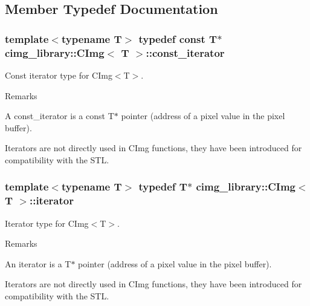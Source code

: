 \subsection{Member Typedef Documentation}
\hypertarget{structcimg__library_1_1_c_img_ad444f21017aaa7da6fab45930d3579aa}{
\subsubsection[{const\_\-iterator}]{\setlength{\rightskip}{0pt plus 5cm}template$<$typename T$>$ typedef const T$\ast$ {\bf cimg\_\-library::CImg}$<$ T $>$::{\bf const\_\-iterator}}}
\label{structcimg__library_1_1_c_img_ad444f21017aaa7da6fab45930d3579aa}


Const iterator type for CImg$<$T$>$. 

\begin{DoxyRemark}{Remarks}

\begin{DoxyItemize}
\item A {\ttfamily const\_\-iterator} is a {\ttfamily const T$\ast$} pointer (address of a pixel value in the pixel buffer).
\item Iterators are not directly used in CImg functions, they have been introduced for compatibility with the STL. 
\end{DoxyItemize}
\end{DoxyRemark}
\hypertarget{structcimg__library_1_1_c_img_a3ff3f07802e67c4ba930427ea45655c8}{
\subsubsection[{iterator}]{\setlength{\rightskip}{0pt plus 5cm}template$<$typename T$>$ typedef T$\ast$ {\bf cimg\_\-library::CImg}$<$ T $>$::{\bf iterator}}}
\label{structcimg__library_1_1_c_img_a3ff3f07802e67c4ba930427ea45655c8}


Iterator type for CImg$<$T$>$. 

\begin{DoxyRemark}{Remarks}

\begin{DoxyItemize}
\item An {\ttfamily iterator} is a {\ttfamily T$\ast$} pointer (address of a pixel value in the pixel buffer).
\item Iterators are not directly used in CImg functions, they have been introduced for compatibility with the STL. 
\end{DoxyItemize}
\end{DoxyRemark}


